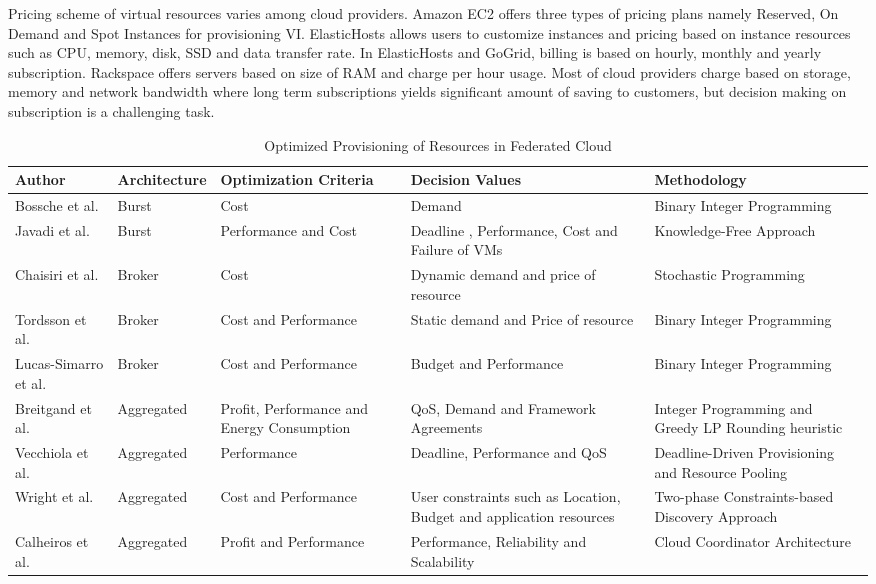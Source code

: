 \documentclass[conference]{IEEEtran}
\begin{document}
Pricing scheme of virtual resources varies among cloud providers. Amazon EC2 offers three types of pricing plans\cite{ec2pricing} namely Reserved, On Demand and Spot Instances for provisioning VI.
ElasticHosts\cite{ehpricing} allows users to customize instances and pricing based on instance resources such as CPU, memory, disk, SSD and data transfer rate. In ElasticHosts and GoGrid\cite{gogridpricing}, billing is based on hourly, monthly and yearly subscription. Rackspace\cite{rackspacepricing} offers servers based on size of RAM and charge per hour usage. Most of cloud providers charge based on storage, memory and network bandwidth where long term subscriptions yields significant amount of saving to customers, but decision making on subscription is a challenging task. 
\begin{table*}[!t]
\renewcommand{\arraystretch}{1.3}
\caption{Optimized Provisioning of Resources in Federated Cloud}
\centering
\begin{tabular}{|p{2.25 cm}|p{1.25 cm}|p{2.5 cm}|p{5 cm}|p{5 cm}|}
\hline 
\bfseries Author &\bfseries  Architecture &\bfseries  Optimization Criteria &\bfseries  Decision Values &\bfseries  Methodology \\
\hline \hline 
Bossche et al. \cite{van2010cost} & Burst & Cost & Demand & Binary Integer Programming \\
\hline
Javadi et al. \cite{javadi2012failure} & Burst & Performance and Cost & Deadline , Performance, Cost and Failure of VMs & Knowledge-Free Approach \\
\hline
Chaisiri et al. \cite{chaisiri2012optimization} & Broker & Cost & Dynamic demand and price of resource & Stochastic Programming \\
\hline 
Tordsson et al. \cite{tordsson2012cloud} & Broker & Cost and Performance & Static demand and Price of resource & Binary Integer Programming \\
\hline
Lucas-Simarro et al. \cite{lucas2012scheduling} & Broker & Cost and Performance & Budget and Performance & Binary Integer Programming \\
\hline
Breitgand et al. \cite{breitgand2011policy} & Aggregated & Profit, Performance and Energy Consumption & QoS, Demand and Framework Agreements & Integer Programming and Greedy LP Rounding heuristic 
\\
\hline


Vecchiola et al. \cite{vecchiola2012deadline} & Aggregated & Performance & Deadline, Performance and QoS & Deadline-Driven Provisioning and Resource Pooling\\
\hline
Wright et al. \cite{wright2012constraints} & Aggregated & Cost and Performance & User constraints such as Location, Budget and application resources & Two-phase Constraints-based Discovery Approach \\
\hline
Calheiros et al. \cite{calheiros2012coordinator} & Aggregated & Profit and Performance & Performance, Reliability and Scalability & Cloud Coordinator Architecture \\
\hline
\hline
\end{tabular}
\end{table*}
\end{document}
